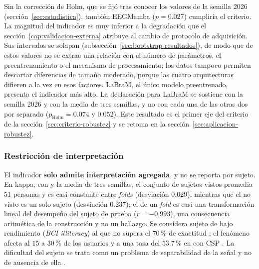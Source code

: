 Sin la corrección de Holm, que se fijó tras conocer los valores de la semilla 2026
(sección~\ref{sec:estadistica}), también EEGMamba ($p = 0.027$) cumpliría el criterio. La magnitud
del indicador es muy inferior a la degradación que el
sección~\ref{cap:validacion-externa} atribuye al cambio de protocolo de adquisición. Sus
intervalos se solapan (subsección~\ref{sec:bootstrap-resultados}), de modo que de estos valores no se
extrae una relación con el número de parámetros, el preentrenamiento o el mecanismo de procesamiento;
los datos tampoco permiten descartar diferencias de tamaño moderado, porque las cuatro arquitecturas
difieren a la vez en esos factores. LaBraM, el único modelo preentrenado, presenta el indicador más
alto. La declaración para LaBraM se sostiene con la semilla 2026 y con la media de tres semillas, y no
con cada una de las otras dos por separado ($p_{\text{Holm}} = 0.074$ y $0.052$). Este resultado es
el primer eje del criterio de la sección~\ref{sec:criterio-robustez} y se retoma en la
sección~\ref{sec:aplicacion-robustez}.

\subsubsection{Restricción de interpretación}

El indicador \textbf{solo admite interpretación agregada}, y no se reporta por sujeto. En kappa, con
\eegnet{} y la media de tres semillas, el conjunto de sujetos vistos promedia $51$ personas y es casi
constante entre \textit{folds} (desviación $0.029$), mientras que el no visto es un solo sujeto
(desviación $0.237$); el \dsi{} de un \textit{fold} es casi una transformación lineal del desempeño
del sujeto de prueba ($r = -0.993$), una consecuencia aritmética de la construcción y no un hallazgo.
Se considera sujeto de bajo rendimiento (\textit{BCI illiteracy}) al que no supera el $70$\,\% de
exactitud \cite{kubler2004,vidaurre2010}; el fenómeno afecta al $15$ a $30$\,\% de los usuarios
\cite{vidaurre2010,blankertz2010} y a una tasa del $53.7$\,\% en \openbmi{} con CSP
\cite{lee2019}. La dificultad del sujeto se trata como un problema de separabilidad de la señal y
no de ausencia de ella \cite{huang2023discrepancy}.

